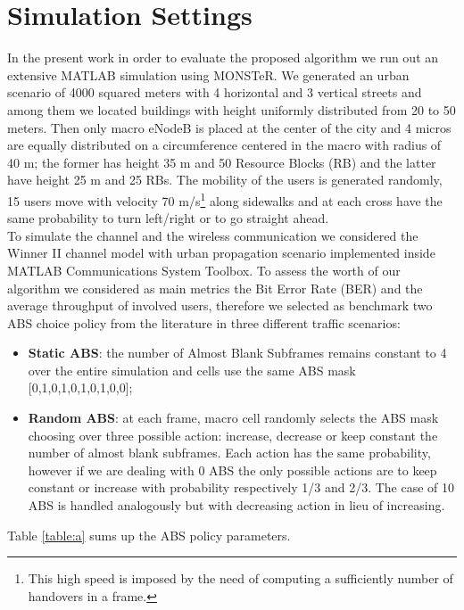 \documentclass[conference,10pt]{IEEEtran}
\begin{document}
\section{Simulation Settings}
In the present work in order to evaluate the proposed algorithm we run out an extensive MATLAB simulation using MONSTeR. We generated an urban scenario of 4000 squared meters with 4 horizontal and 3 vertical streets and among them we located buildings with height uniformly distributed from 20 to 50 meters. Then only macro eNodeB is placed at the center of the city and 4 micros are equally distributed on a circumference centered in the macro with radius of 40 m; the former has height 35 m and 50 Resource Blocks (RB) and the latter have height 25 m and 25 RBs. The mobility of the users is generated randomly, 15 users move with velocity 70 m/s\footnote{This high speed is imposed by the need of computing a sufficiently number of handovers in a frame.} along sidewalks and at each cross have the same probability to turn left/right or to go straight ahead.\\
To simulate the channel and the wireless communication we considered the Winner II channel model \cite{bultitude20074} with urban propagation scenario implemented inside MATLAB Communications System Toolbox.
To assess the worth of our algorithm we considered as main metrics the Bit Error Rate (BER) and the average throughput of involved users, therefore we selected as benchmark two ABS choice policy from the literature in three different traffic scenarios:
\begin{itemize}
	\item \textbf{Static ABS}: the number of Almost Blank Subframes remains constant to 4 over the entire simulation and  cells use the same ABS mask 
    [0,1,0,1,0,1,0,1,0,0];
    \item \textbf{Random ABS}:  at each frame, macro cell randomly selects the ABS mask choosing over three possible action: increase, decrease or keep constant the number of almost blank subframes. Each action has the same probability, however if we are dealing with 0 ABS the only possible actions are to keep constant or increase with probability respectively 1/3 and 2/3. The case of 10 ABS is handled analogously but with decreasing action in lieu of increasing.
\end{itemize}
Table \ref{table:a} sums up the ABS policy parameters.
\end{document}
